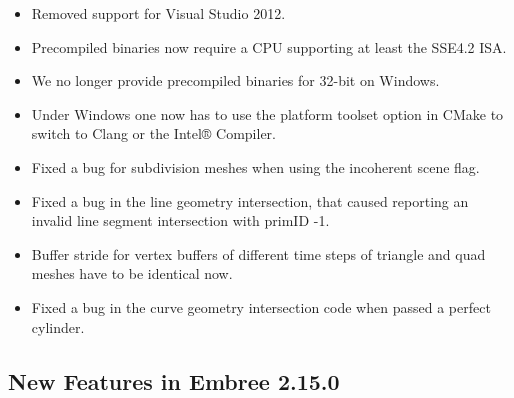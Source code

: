\begin{itemize}
\item
  Removed support for Visual Studio 2012.
\item
  Precompiled binaries now require a CPU supporting at least the SSE4.2
  ISA.
\item
  We no longer provide precompiled binaries for 32-bit on Windows.
\item
  Under Windows one now has to use the platform toolset option in CMake
  to switch to Clang or the Intel® Compiler.
\item
  Fixed a bug for subdivision meshes when using the incoherent scene
  flag.
\item
  Fixed a bug in the line geometry intersection, that caused reporting
  an invalid line segment intersection with primID -1.
\item
  Buffer stride for vertex buffers of different time steps of triangle
  and quad meshes have to be identical now.
\item
  Fixed a bug in the curve geometry intersection code when passed a
  perfect cylinder.
\end{itemize}

\subsection{New Features in Embree
2.15.0}\label{new-features-in-embree-2.15.0}

